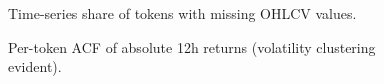 \documentclass[
  a4paper,
  DIV=11,
  numbers=noendperiod]{scrreprt}
\begin{document}
\begin{figure}


\caption{\label{fig-3-5-timeseries-missingness-ohlcv}Time-series share
of tokens with missing OHLCV values.}

\end{figure}%

\begin{figure}


\caption{\label{fig-acf-abs-returns}Per-token ACF of absolute 12h
returns (volatility clustering evident).}

\end{figure}%
\end{document}
